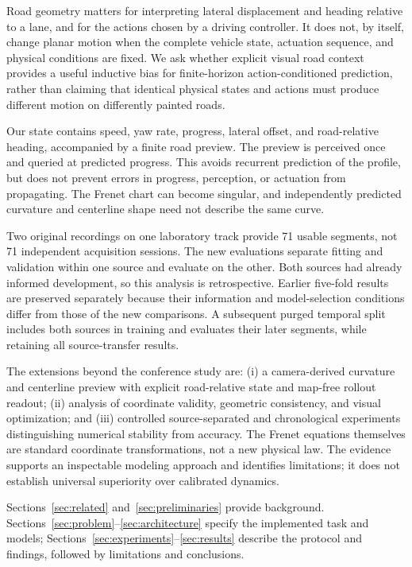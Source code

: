 \documentclass[preprint,12pt]{elsarticle}
\begin{document}
Road geometry matters for interpreting lateral displacement and heading relative
to a lane, and for the actions chosen by a driving controller. It does not, by
itself, change planar motion when the complete vehicle state, actuation sequence,
and physical conditions are fixed. We ask whether explicit visual road context
provides a useful inductive bias for finite-horizon action-conditioned prediction,
rather than claiming that identical physical states and actions must produce
different motion on differently painted roads.

Our state contains speed, yaw rate, progress, lateral offset, and road-relative
heading, accompanied by a finite road preview. The preview is perceived once and
queried at predicted progress. This avoids recurrent prediction of the profile,
but does not prevent errors in progress, perception, or actuation from
propagating. The Frenet chart can become singular, and independently predicted
curvature and centerline shape need not describe the same curve.

Two original recordings on one laboratory track provide 71 usable segments, not
71 independent acquisition sessions. The new evaluations separate fitting and
validation within one source and evaluate on the other. Both sources had already
informed development, so this analysis is retrospective. Earlier five-fold
results are preserved separately because their information and model-selection
conditions differ from those of the new comparisons. A subsequent purged temporal split includes both
sources in training and evaluates their later segments, while retaining all
source-transfer results.

The extensions beyond the conference study are: (i) a camera-derived curvature
and centerline preview with explicit road-relative state and map-free rollout
readout; (ii) analysis of coordinate validity, geometric consistency, and visual
optimization; and (iii) controlled source-separated and chronological experiments distinguishing
numerical stability from accuracy. The Frenet equations themselves are standard
coordinate transformations, not a new physical law. The evidence supports an
inspectable modeling approach and identifies limitations; it does not establish
universal superiority over calibrated dynamics.

Sections~\ref{sec:related} and~\ref{sec:preliminaries} provide background.
Sections~\ref{sec:problem}--\ref{sec:architecture} specify the implemented task
and models; Sections~\ref{sec:experiments}--\ref{sec:results} describe the protocol
and findings, followed by limitations and conclusions.
\end{document}
